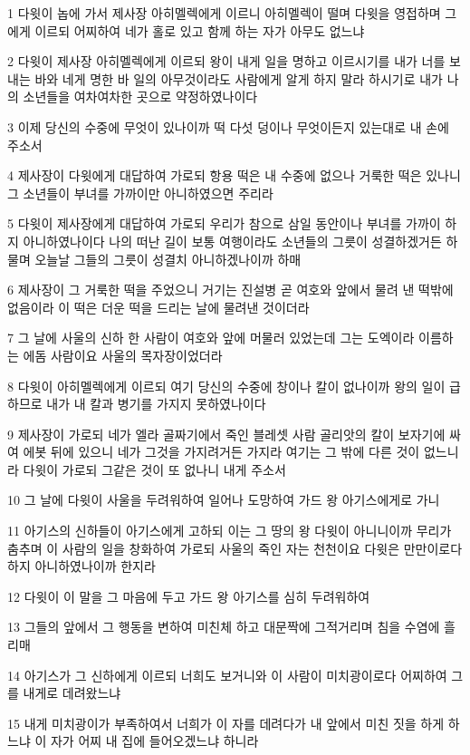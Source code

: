 \par 1 다윗이 놉에 가서 제사장 아히멜렉에게 이르니 아히멜렉이 떨며 다윗을 영접하며 그에게 이르되 어찌하여 네가 홀로 있고 함께 하는 자가 아무도 없느냐
\par 2 다윗이 제사장 아히멜렉에게 이르되 왕이 내게 일을 명하고 이르시기를 내가 너를 보내는 바와 네게 명한 바 일의 아무것이라도 사람에게 알게 하지 말라 하시기로 내가 나의 소년들을 여차여차한 곳으로 약정하였나이다
\par 3 이제 당신의 수중에 무엇이 있나이까 떡 다섯 덩이나 무엇이든지 있는대로 내 손에 주소서
\par 4 제사장이 다윗에게 대답하여 가로되 항용 떡은 내 수중에 없으나 거룩한 떡은 있나니 그 소년들이 부녀를 가까이만 아니하였으면 주리라
\par 5 다윗이 제사장에게 대답하여 가로되 우리가 참으로 삼일 동안이나 부녀를 가까이 하지 아니하였나이다 나의 떠난 길이 보통 여행이라도 소년들의 그릇이 성결하겠거든 하물며 오늘날 그들의 그릇이 성결치 아니하겠나이까 하매
\par 6 제사장이 그 거룩한 떡을 주었으니 거기는 진설병 곧 여호와 앞에서 물려 낸 떡밖에 없음이라 이 떡은 더운 떡을 드리는 날에 물려낸 것이더라
\par 7 그 날에 사울의 신하 한 사람이 여호와 앞에 머물러 있었는데 그는 도엑이라 이름하는 에돔 사람이요 사울의 목자장이었더라
\par 8 다윗이 아히멜렉에게 이르되 여기 당신의 수중에 창이나 칼이 없나이까 왕의 일이 급하므로 내가 내 칼과 병기를 가지지 못하였나이다
\par 9 제사장이 가로되 네가 엘라 골짜기에서 죽인 블레셋 사람 골리앗의 칼이 보자기에 싸여 에봇 뒤에 있으니 네가 그것을 가지려거든 가지라 여기는 그 밖에 다른 것이 없느니라 다윗이 가로되 그같은 것이 또 없나니 내게 주소서
\par 10 그 날에 다윗이 사울을 두려워하여 일어나 도망하여 가드 왕 아기스에게로 가니
\par 11 아기스의 신하들이 아기스에게 고하되 이는 그 땅의 왕 다윗이 아니니이까 무리가 춤추며 이 사람의 일을 창화하여 가로되 사울의 죽인 자는 천천이요 다윗은 만만이로다 하지 아니하였나이까 한지라
\par 12 다윗이 이 말을 그 마음에 두고 가드 왕 아기스를 심히 두려워하여
\par 13 그들의 앞에서 그 행동을 변하여 미친체 하고 대문짝에 그적거리며 침을 수염에 흘리매
\par 14 아기스가 그 신하에게 이르되 너희도 보거니와 이 사람이 미치광이로다 어찌하여 그를 내게로 데려왔느냐
\par 15 내게 미치광이가 부족하여서 너희가 이 자를 데려다가 내 앞에서 미친 짓을 하게 하느냐 이 자가 어찌 내 집에 들어오겠느냐 하니라

